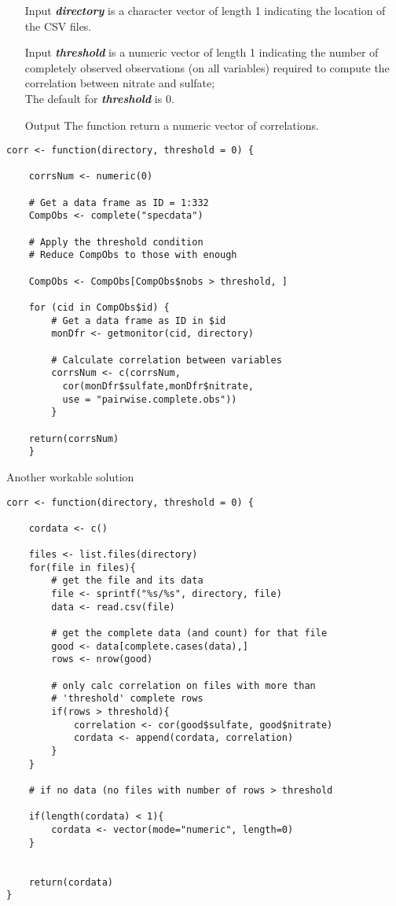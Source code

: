 \documentclass[12pt]{article}
\begin{document}
\begin{itemize}
\item[Input] \textit{\textbf{directory}} is a character vector of length 1 indicating the
    location of the CSV files. 
\item[Input] \textit{\textbf{threshold}} is a numeric vector of length 1
   indicating the number of completely observed observations (on all variables) required to compute the correlation between nitrate and sulfate; \\ The default for \textit{\textbf{threshold}} is 0. 
\item[Output] The function return a numeric vector of correlations.
\end{itemize}    
\begin{framed}    
\begin{verbatim}
corr <- function(directory, threshold = 0) {

    corrsNum <- numeric(0)

    # Get a data frame as ID = 1:332
    CompObs <- complete("specdata")

    # Apply the threshold condition
    # Reduce CompObs to those with enough
    
    CompObs <- CompObs[CompObs$nobs > threshold, ]

    for (cid in CompObs$id) {
        # Get a data frame as ID in $id
        monDfr <- getmonitor(cid, directory)

        # Calculate correlation between variables
        corrsNum <- c(corrsNum, 
          cor(monDfr$sulfate,monDfr$nitrate, 
          use = "pairwise.complete.obs"))
        }

    return(corrsNum)
    }
\end{verbatim}
\end{framed}
\newpage
Another workable solution
\begin{verbatim}
corr <- function(directory, threshold = 0) {
  
    cordata <- c()

    files <- list.files(directory)
    for(file in files){
        # get the file and its data
        file <- sprintf("%s/%s", directory, file)
        data <- read.csv(file)

        # get the complete data (and count) for that file
        good <- data[complete.cases(data),]
        rows <- nrow(good)

        # only calc correlation on files with more than
        # 'threshold' complete rows
        if(rows > threshold){
            correlation <- cor(good$sulfate, good$nitrate)
            cordata <- append(cordata, correlation)
        }
    }

    # if no data (no files with number of rows > threshold
    
    if(length(cordata) < 1){
        cordata <- vector(mode="numeric", length=0)
    }

    
    return(cordata)
}
\end{verbatim}	
\end{document}
